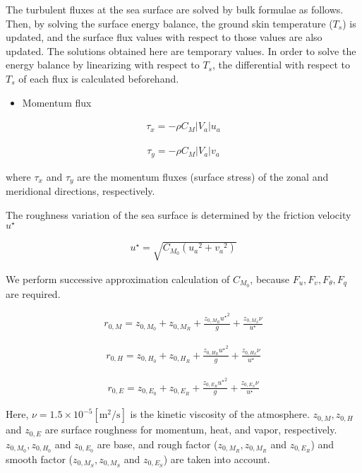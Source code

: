 \begin{itemize}
The turbulent fluxes at the sea surface are solved by bulk formulae as
follows. Then, by solving the surface energy balance, the ground skin
temperature (\(T_s\)) is updated, and the surface flux values with
respect to those values are also updated. The solutions obtained here
are temporary values. In order to solve the energy balance by
linearizing with respect to \(T_s\), the differential with respect to
\(T_s\) of each flux is calculated beforehand.

\begin{itemize}
\tightlist
\item
  Momentum flux
\end{itemize}

\begin{eqnarray}
 \tau_x = - \rho C_{M}|V_a| u_a
\end{eqnarray}

\begin{eqnarray}
 \tau_y = - \rho C_{M}|V_a| v_a
\end{eqnarray}

where \(\tau_x\) and \(\tau_y\) are the momentum fluxes (surface stress)
of the zonal and meridional directions, respectively.

The roughness variation of the sea surface is determined by the friction
velocity \(u^\star\)

\begin{eqnarray}
u^{\star} = \sqrt{C_{M_0} ({u_a}^2  +{v_a}^2)}
\end{eqnarray}

We perform successive approximation calculation of \({C_{M_0}}\),
because \(F_u,F_v,F_\theta,F_q\) are required.

\begin{eqnarray}
    r_{0,M} = z_{0,M_0} + z_{0,M_R} + \frac{z_{0,M_R} {u^\star }^2 }{g} + \frac{z_{0,M_S}\nu }{u^\star}
\end{eqnarray}

\begin{eqnarray}
    r_{0,H} = z_{0,H_0} + z_{0,H_R} + \frac{z_{0,H_R} {u^\star }^2 }{g} + \frac{z_{0,H_S}\nu }{u^\star}
\end{eqnarray}

\begin{eqnarray}
    r_{0,E} = z_{0,E_0} + z_{0,E_R} + \frac{z_{0,E_R} {u^\star }^2 }{g} + \frac{z_{0,E_S}\nu }{u^\star}
\end{eqnarray}

Here, \(\nu = 1.5 \times 10^{-5} \mathrm{[m^2/s]}\) is the kinetic
viscosity of the atmosphere. \(z_{0,M},z_{0,H}\) and \(z_{0,E}\) are
surface roughness for momentum, heat, and vapor, respectively.
\(z_{0,M_0},z_{0,H_0}\) and \(z_{0,E_0}\) are base, and rough factor
(\(z_{0,M_R},z_{0,M_R}\) and \(z_{0,E_R}\)) and smooth factor
(\(z_{0,M_S},z_{0,M_S}\) and \(z_{0,E_S}\)) are taken into account.


\end{itemize}
